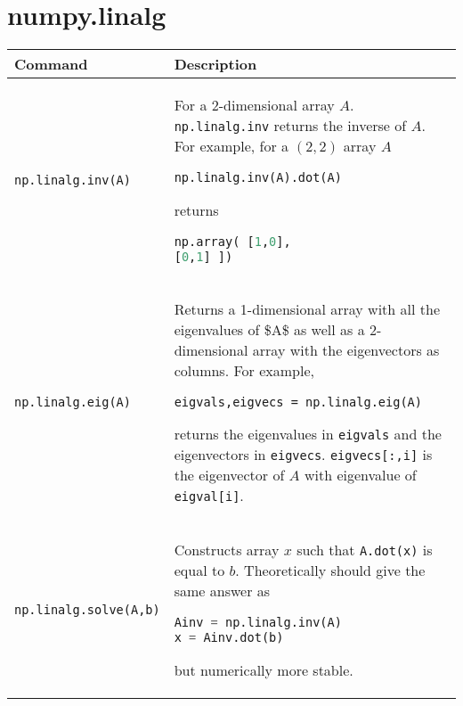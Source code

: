 \section{numpy.linalg}\label{numpy.linalg}

\begin{tabular}[]{@{}ll@{}}
\toprule
\begin{minipage}[b]{0.19\columnwidth}\raggedright\strut
Command\strut
\end{minipage} & \begin{minipage}[b]{0.75\columnwidth}\raggedright\strut
Description\strut
\end{minipage}\tabularnewline
\midrule
\begin{minipage}[t]{0.19\columnwidth}\raggedright\strut
\lstinline!np.linalg.inv(A)!\strut
\end{minipage} & \begin{minipage}[t]{0.75\columnwidth}\raggedright\strut
For a 2-dimensional array \(A\). \lstinline!np.linalg.inv! returns the
inverse of \(A\). For example, for a \((2,2)\) array \(A\)

\begin{lstlisting}[language=Python]
np.linalg.inv(A).dot(A)
\end{lstlisting}

returns

\begin{lstlisting}[language=Python]
np.array( [1,0],
[0,1] ])
\end{lstlisting}
\strut
\end{minipage}\tabularnewline
\begin{minipage}[t]{0.19\columnwidth}\raggedright\strut
\lstinline!np.linalg.eig(A)!\strut
\end{minipage} & \begin{minipage}[t]{0.75\columnwidth}\raggedright\strut
Returns a 1-dimensional array with all the eigenvalues of \$A\$ as well
as a 2-dimensional array with the eigenvectors as columns. For example,

\lstinline!eigvals,eigvecs = np.linalg.eig(A)!

returns the eigenvalues in \lstinline!eigvals! and the eigenvectors in
\lstinline!eigvecs!. \lstinline!eigvecs[:,i]! is the eigenvector of
\(A\) with eigenvalue of \lstinline!eigval[i]!.\strut
\end{minipage}\tabularnewline
\begin{minipage}[t]{0.19\columnwidth}\raggedright\strut
\lstinline!np.linalg.solve(A,b)!\strut
\end{minipage} & \begin{minipage}[t]{0.75\columnwidth}\raggedright\strut
Constructs array \(x\) such that \lstinline!A.dot(x)! is equal to \(b\).
Theoretically should give the same answer as

\begin{lstlisting}[language=Python]
Ainv = np.linalg.inv(A)
x = Ainv.dot(b)
\end{lstlisting}

but numerically more stable.\strut
\end{minipage}\tabularnewline
\bottomrule
\end{tabular}


